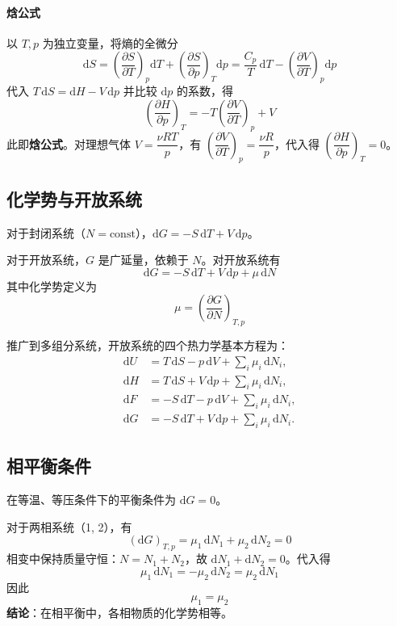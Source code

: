 \documentclass[UTF8]{ctexart}
\begin{document}
\paragraph{焓公式}
以 $T,p$ 为独立变量，将熵的全微分
\[
\mathrm{d}S=\left(\frac{\partial S}{\partial T}\right)_p\mathrm{d}T
+\left(\frac{\partial S}{\partial p}\right)_T\mathrm{d}p
=\frac{C_p}{T}\,\mathrm{d}T-\left(\frac{\partial V}{\partial T}\right)_p\mathrm{d}p
\]
代入 $T\,\mathrm{d}S=\mathrm{d}H-V\,\mathrm{d}p$ 并比较 $\mathrm{d}p$ 的系数，得
\[
\boxed{\left(\frac{\partial H}{\partial p}\right)_T
=-T\left(\frac{\partial V}{\partial T}\right)_p+V}
\]
此即\textbf{焓公式}。对理想气体 $V=\dfrac{\nu RT}{p}$，有 $\left(\dfrac{\partial V}{\partial T}\right)_p=\dfrac{\nu R}{p}$，代入得 $\left(\dfrac{\partial H}{\partial p}\right)_T=0$。

\subsection{化学势与开放系统}

对于封闭系统（$N=\text{const}$），$\mathrm{d}G=-S\,\mathrm{d}T+V\,\mathrm{d}p$。

对于开放系统，$G$ 是广延量，依赖于 $N$。对开放系统有
\[
\boxed{\mathrm{d}G=-S\,\mathrm{d}T+V\,\mathrm{d}p+\mu\,\mathrm{d}N}
\]
其中化学势定义为
\[
\boxed{\mu=\left(\frac{\partial G}{\partial N}\right)_{T,p}}
\]

推广到多组分系统，开放系统的四个热力学基本方程为：
\begin{align*}
  \mathrm{d}U &= T\,\mathrm{d}S-p\,\mathrm{d}V+\sum_i\mu_i\,\mathrm{d}N_i,\\
  \mathrm{d}H &= T\,\mathrm{d}S+V\,\mathrm{d}p+\sum_i\mu_i\,\mathrm{d}N_i,\\
  \mathrm{d}F &= -S\,\mathrm{d}T-p\,\mathrm{d}V+\sum_i\mu_i\,\mathrm{d}N_i,\\
  \mathrm{d}G &= -S\,\mathrm{d}T+V\,\mathrm{d}p+\sum_i\mu_i\,\mathrm{d}N_i.
\end{align*}

\subsection{相平衡条件}

在等温、等压条件下的平衡条件为 $\mathrm{d}G=0$。

对于两相系统（1, 2），有
\[
(\mathrm{d}G)_{T,p}=\mu_1\,\mathrm{d}N_1+\mu_2\,\mathrm{d}N_2=0
\]
相变中保持质量守恒：$N=N_1+N_2$，故 $\mathrm{d}N_1+\mathrm{d}N_2=0$。代入得
\[
\mu_1\,\mathrm{d}N_1=-\mu_2\,\mathrm{d}N_2=\mu_2\,\mathrm{d}N_1
\]
因此
\[
\boxed{\mu_1=\mu_2}
\]
\textbf{结论}：在相平衡中，各相物质的化学势相等。
\end{document}
